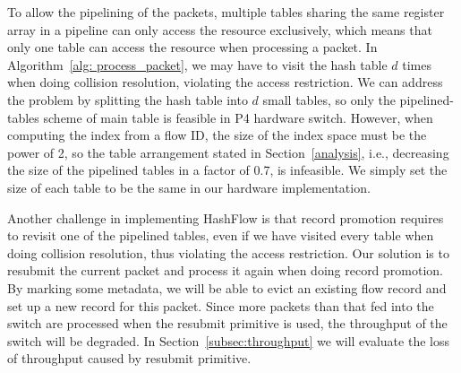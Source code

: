 To allow the pipelining of the packets, multiple tables sharing the same register array in a pipeline can only access the resource exclusively, which means that only one table can access the resource when processing a packet. In Algorithm~\ref{alg: process_packet}, we may have to visit the hash table $d$ times when doing collision resolution, violating the access restriction. We can address the problem by splitting the hash table into $d$ small tables, so only the pipelined-tables scheme of main table is feasible in P4 hardware switch. However, when computing the index from a flow ID, the size of the index space must be the power of 2, so the table arrangement stated in Section~\ref{analysis}, i.e., decreasing the size of the pipelined tables in a factor of 0.7, is infeasible. We simply set the size of each table to be the same in our hardware implementation.

Another challenge in implementing HashFlow is that record promotion requires to revisit one of the pipelined tables, even if we have visited every table when doing collision resolution, thus violating the access restriction. Our solution is to resubmit the current packet and process it again when doing record promotion. By marking some metadata, we will be able to evict an existing flow record and set up a new record for this packet. Since more packets than that fed into the switch are processed when the resubmit primitive is used, the throughput of the switch will be degraded. In Section~\ref{subsec:throughput} we will evaluate the loss of throughput caused by resubmit primitive.

